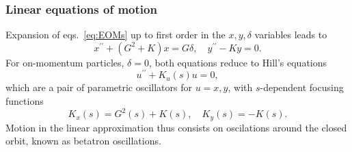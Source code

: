 \subsubsection{Linear equations of motion}
Expansion of eqs.~\eqref{eq:EOMs} up to first order in the $x, y, \delta$ variables leads to \cite{sands_1969}
    \begin{equation}
        x^{\prime\prime}+(G^2+K)x=G\delta, \quad
        y^{\prime\prime}-Ky=0.
        \label{eq:linearEOM}
    \end{equation}
    For on-momentum particles, $\delta=0$, both equations reduce to Hill's equations
    \begin{equation}
        u^{\prime\prime}+K_u(s)u = 0,
        \label{eq:Hill}
    \end{equation}
    which are a pair of parametric oscillators for $u=x,y$, with $s$-dependent focusing functions
         $$K_x(s) = G^2(s) + K(s), \quad K_y(s) = - K(s).$$
Motion in the linear approximation thus consists on oscilations around the closed orbit, known as betatron oscillations.
